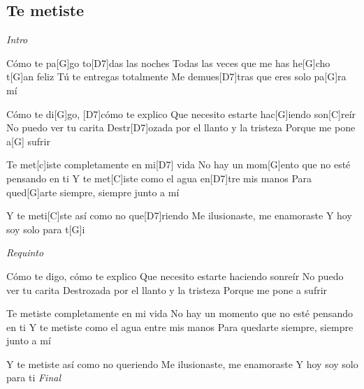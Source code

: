 \subsection{Te metiste}

\noindent
\vspace{1cm}

\begin{guitar}
	\begin{multicols}{2}
		\textit{Intro}\par
		Cómo te pa[G]go to[D7]das las noches
		Todas las veces que me has he[G]cho t[G]an feliz
	Tú te entregas totalmente
	Me demues[D7]tras que eres solo pa[G]ra mí

	Cómo te di[G]go, [D7]cómo te explico
	Que necesito estarte hac[G]iendo son[C]reír
	No puedo ver tu carita
	Destr[D7]ozada por el llanto y la tristeza
	Porque me pone a[G] sufrir

	Te met[c]iste completamente en mi[D7] vida
	No hay un mom[G]ento que no esté pensando en ti
	Y te met[C]iste como el agua en[D7]tre mis manos
	Para qued[G]arte siempre, siempre junto a mí

	Y te meti[C]ste así como no que[D7]riendo
	Me ilusionaste, me enamoraste
	Y hoy soy solo para t[G]i

	\par
	\textit{Requinto}

	Cómo te digo, cómo te explico
	Que necesito estarte haciendo sonreír
	No puedo ver tu carita
	Destrozada por el llanto y la tristeza
	Porque me pone a sufrir

	Te metiste completamente en mi vida
	No hay un momento que no esté pensando en ti
	Y te metiste como el agua entre mis manos
	Para quedarte siempre, siempre junto a mí

	Y te metiste así como no queriendo
	Me ilusionaste, me enamoraste
	Y hoy soy solo para ti
		\textit{Final}
	\end{multicols}
\end{guitar}
